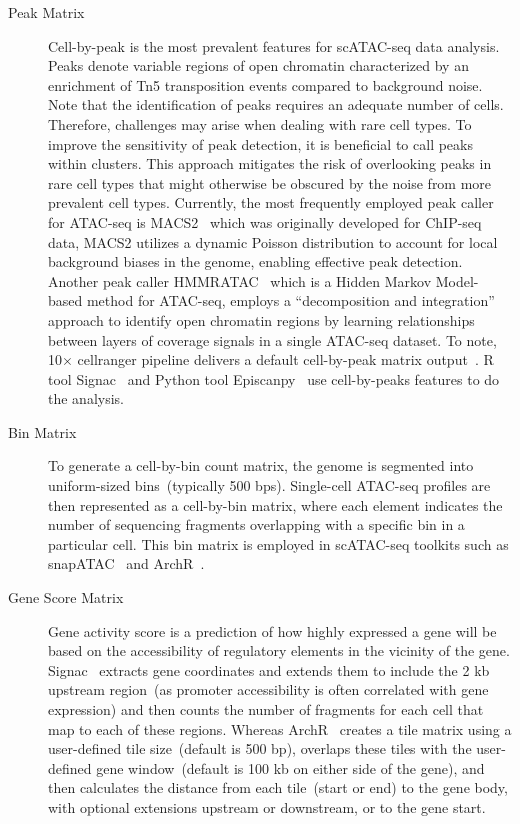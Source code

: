 \begin{description}
	\item[Peak Matrix]
	Cell-by-peak is the most prevalent features for scATAC-seq data analysis. Peaks denote variable regions of open chromatin characterized by an enrichment of Tn5 transposition events compared to background noise. Note that the identification of peaks requires an adequate number of cells. Therefore, challenges may arise when dealing with rare cell types. To improve the sensitivity of peak detection, it is beneficial to call peaks within clusters. This approach mitigates the risk of overlooking peaks in rare cell types that might otherwise be obscured by the noise from more prevalent cell types. Currently, the most frequently employed peak caller for ATAC-seq is MACS2~\citep{zhang2008macs2} which was originally developed for ChIP-seq data, MACS2 utilizes a dynamic Poisson distribution to account for local background biases in the genome, enabling effective peak detection. Another peak caller HMMRATAC~\citep{tarbell2019hmmratac} which is a Hidden Markov Model-based method for ATAC-seq, employs a ``decomposition and integration'' approach to identify open chromatin regions by learning relationships between layers of coverage signals in a single ATAC-seq dataset. To note, 10$\times$ cellranger pipeline delivers a default cell-by-peak matrix output~\citep{satpathy2019massively}. R tool Signac~\citep{signac} and Python tool Episcanpy~\citep{Danese2021episcanpy} use cell-by-peaks features to do the analysis.

	\item[Bin Matrix]
	To generate a cell-by-bin count matrix, the genome is segmented into uniform-sized bins~(typically 500 bps). Single-cell ATAC-seq profiles are then represented as a cell-by-bin matrix, where each element indicates the number of sequencing fragments overlapping with a specific bin in a particular cell. This bin matrix is employed in scATAC-seq toolkits such as snapATAC~\citep{fang2021snapatac} and ArchR~\citep{Granja2021}.

	\item[Gene Score Matrix]
	Gene activity score is a prediction of how highly expressed a gene will be based on the accessibility of regulatory elements in the vicinity of the gene. Signac~\citep{signac} extracts gene coordinates and extends them to include the 2 kb upstream region~(as promoter accessibility is often correlated with gene expression) and then counts the number of fragments for each cell that map to each of these regions. Whereas ArchR~\citep{granja2019single} creates a tile matrix using a user-defined tile size~(default is 500 bp), overlaps these tiles with the user-defined gene window~(default is 100 kb on either side of the gene), and then calculates the distance from each tile~(start or end) to the gene body, with optional extensions upstream or downstream, or to the gene start.
\end{description}

